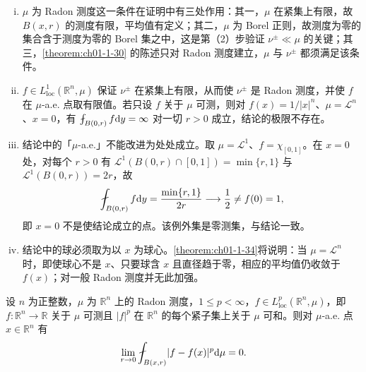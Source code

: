 \documentclass[../../main.tex]{subfiles}%
\begin{document}
\begin{remark}\label{remark:ch01-thm-1-32-条件}
\begin{enumerate}[(i)]
\item $\mu$ 为 Radon 测度这一条件在证明中有三处作用：其一，$\mu$ 在紧集上有限，故 $B(x,r)$ 的测度有限，平均值有定义；其二，$\mu$ 为 Borel 正则，故测度为零的集合含于测度为零的 Borel 集之中，这是第（2）步验证 $\nu^{\pm}\ll\mu$ 的关键；其三，\cref{theorem:ch01-1-30} 的陈述只对 Radon 测度建立，$\mu$ 与 $\nu^{\pm}$ 都须满足该条件。%
\item $f\in L^{1}_{\mathrm{loc}}(\mathbb{R}^n,\mu)$ 保证 $\nu^{\pm}$ 在紧集上有限，从而使 $\nu^{\pm}$ 是 Radon 测度，并使 $f$ 在 $\mu$-a.e. 点取有限值。若只设 $f$ 关于 $\mu$ 可测，则对 $f(x)=1/\lvert x\rvert^{n}$、$\mu=\mathcal{L}^{n}$、$x=0$，有 $\fint_{B(0,r)}f\diff y=\infty$ 对一切 $r>0$ 成立，结论的极限不存在。
\item 结论中的「$\mu$-a.e.」不能改进为处处成立。取 $\mu=\mathcal{L}^{1}$、$f=\chi_{[0,1]}$。在 $x=0$ 处，对每个 $r>0$ 有 $\mathcal{L}^{1}(B(0,r)\cap[0,1])=\min\{r,1\}$ 与 $\mathcal{L}^{1}(B(0,r))=2r$，故
\begin{align*}
\fint_{B(0,r)}f\diff y=\frac{\min\{r,1\}}{2r}\longrightarrow\frac{1}{2}\neq f(0)=1 ,
\end{align*}
即 $x=0$ 不是使结论成立的点。该例外集是零测集，与结论一致。
\item 结论中的球必须取为以 $x$ 为球心。\cref{theorem:ch01-1-34}将说明：当 $\mu=\mathcal{L}^{n}$ 时，即使球心不是 $x$、只要球含 $x$ 且直径趋于零，相应的平均值仍收敛于 $f(x)$；对一般 Radon 测度并无此加强。%
\end{enumerate}
\end{remark}

\begin{theorem}\label{theorem:ch01-1-33}
设 $n$ 为正整数，$\mu$ 为 $\mathbb{R}^n$ 上的 Radon 测度，$1\leqslant p<\infty$，$f\in L^{p}_{\mathrm{loc}}(\mathbb{R}^n,\mu)$，即 $f:\mathbb{R}^n\to\mathbb{R}$ 关于 $\mu$ 可测且 $\lvert f\rvert^{p}$ 在 $\mathbb{R}^n$ 的每个紧子集上关于 $\mu$ 可和。则对 $\mu$-a.e. 点 $x\in\mathbb{R}^n$ 有
\begin{align*}
\lim_{r\to0}\fint_{B(x,r)}\lvert f-f(x)\rvert^{p}\diff\mu=0 .
\end{align*}
\end{theorem}
\end{document}
